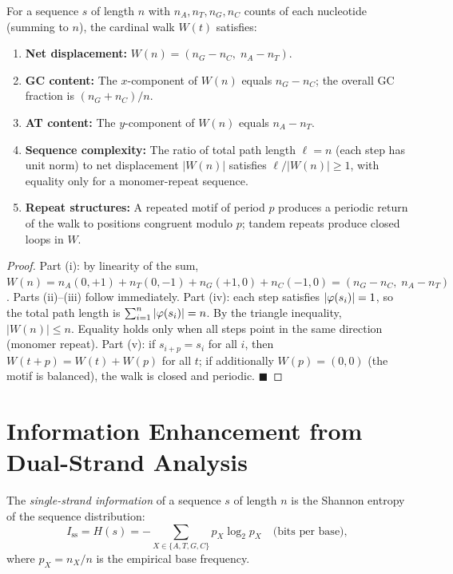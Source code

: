 \begin{proposition}
\label{prop:walk_invariants}
For a sequence $s$ of length $n$ with $n_A, n_T, n_G, n_C$ counts of each
nucleotide (summing to $n$), the cardinal walk $W(t)$ satisfies:
\begin{enumerate}[label=(\roman*)]
  \item \textbf{Net displacement:}
    $W(n) = (n_G - n_C,\; n_A - n_T)$.
  \item \textbf{GC content:} The $x$-component of $W(n)$ equals $n_G - n_C$;
    the overall GC fraction is $(n_G + n_C)/n$.
  \item \textbf{AT content:} The $y$-component of $W(n)$ equals $n_A - n_T$.
  \item \textbf{Sequence complexity:} The ratio of total path length
    $\ell = n$ (each step has unit norm) to net displacement $|W(n)|$
    satisfies $\ell/|W(n)| \geq 1$, with equality only for a
    monomer-repeat sequence.
  \item \textbf{Repeat structures:} A repeated motif of period $p$
    produces a periodic return of the walk to positions congruent
    modulo $p$; tandem repeats produce closed loops in $W$.
\end{enumerate}
\end{proposition}

\begin{proof}
Part (i): by linearity of the sum, $W(n) = n_A(0,+1) + n_T(0,-1) +
n_G(+1,0) + n_C(-1,0) = (n_G - n_C,\; n_A - n_T)$.
Parts (ii)--(iii) follow immediately.
Part (iv): each step satisfies $|\varphi(s_i)| = 1$, so the total
path length is $\sum_{i=1}^n |\varphi(s_i)| = n$. By the triangle
inequality, $|W(n)| \leq n$. Equality holds only when all steps point
in the same direction (monomer repeat). Part (v): if $s_{i+p} = s_i$
for all $i$, then $W(t+p) = W(t) + W(p)$ for all $t$; if additionally
$W(p) = (0,0)$ (the motif is balanced), the walk is closed and periodic. $\blacksquare$
\end{proof}

\section{Information Enhancement from Dual-Strand Analysis}
\label{sec:information_enhancement}

\begin{definition}
\label{def:ss_information}
The \emph{single-strand information} of a sequence $s$ of length $n$ is
the Shannon entropy of the sequence distribution:
\begin{equation}
  I_{\mathrm{ss}} = H(s) = -\sum_{X \in \{A,T,G,C\}} p_X \log_2 p_X \quad \text{(bits per base)},
\end{equation}
where $p_X = n_X / n$ is the empirical base frequency.
\end{definition}

